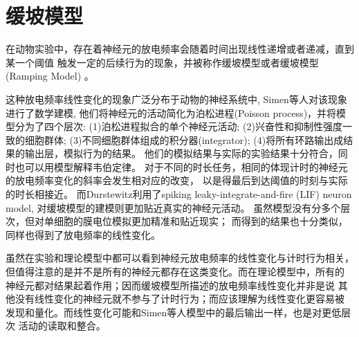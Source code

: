 \section{缓坡模型}

在动物实验中，存在着神经元的放电频率会随着时间出现线性递增或者递减，直到某一个阈值
触发一定的后续行为的现象，并被称作缓坡模型或者缓坡模型(Ramping Model)
\cite{durstewitz2003self,simen2011model,paton2018neural}。

这种放电频率线性变化的现象广泛分布于动物的神经系统中\cite{durstewitz2003self,simen2011model},
Simen等人对该现象进行了数学建模,
他们将神经元的活动简化为泊松进程(Poisson process)，并将模型分为了四个层次:
(1)泊松进程拟合的单个神经元活动; (2)兴奋性和抑制性强度一致的细胞群体;
(3)不同细胞群体组成的积分器(integrator); (4)将所有环路输出成结果的输出层，模拟行为的结果\cite{simen2011model}。
他们的模拟结果与实际的实验结果十分符合，同时也可以用模型解释韦伯定律。
对于不同的时长任务，相同的体现计时的神经元的放电频率变化的斜率会发生相对应的改变，
以是得最后到达阈值的时刻与实际的时长相接近。
而Durstewitz利用了spiking leaky-integrate-and-fire (LIF) neuron model,
对缓坡模型的建模则更加贴近真实的神经元活动\cite{durstewitz2003self}。
虽然模型没有分多个层次，但对单细胞的膜电位模拟更加精准和贴近现实；
而得到的结果也十分类似，同样也得到了放电频率的线性变化。

虽然在实验和理论模型中都可以看到神经元放电频率的线性变化与计时行为相关，
但值得注意的是并不是所有的神经元都存在这类变化。而在理论模型中，所有的
神经元都对结果起着作用；因而缓坡模型所描述的放电频率线性变化并非是说
其他没有线性变化的神经元就不参与了计时行为；而应该理解为线性变化更容易被
发现和量化。而线性变化可能和Simen等人模型中的最后输出一样，也是对更低层次
活动的读取和整合。

